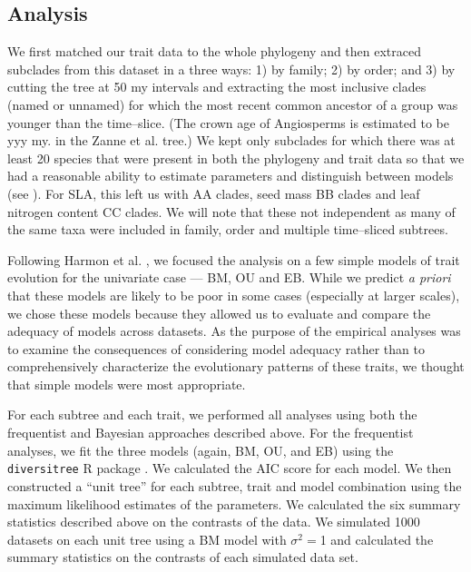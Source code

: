 \documentclass[a4paper,12pt]{article}
\begin{document}
\subsection{Analysis}

We first matched our trait data to the whole phylogeny and then extraced subclades from this dataset in a three ways: 1) by family; 2) by order; and 3) by cutting the tree at 50 my intervals and extracting the most inclusive clades (named or unnamed) for which the most recent common ancestor of a group was younger than the time--slice. (The crown age of Angiosperms is estimated to be yyy my. in the Zanne et al. tree.) We kept only subclades for which there was at least 20 species that were present in both the phylogeny and trait data so that we had a reasonable ability to estimate parameters and distinguish between models (see \citep{Boettiger2012, SlaterPennell}). For SLA, this left us with AA clades, seed mass BB clades and leaf nitrogen content CC clades. We will note that these not independent as many of the same taxa were included in family, order and multiple time--sliced subtrees. 

Following Harmon et al. \citep{Harmon2010}, we focused the analysis on a few simple models of trait evolution for the univariate case --- BM, OU and EB. While we predict \textit{a priori} that these models are likely to be poor in some cases (especially at larger scales), we chose these models because they allowed us to evaluate and compare the adequacy of models across datasets. As the purpose of the empirical analyses was to examine the consequences of considering model adequacy rather than to comprehensively characterize the evolutionary patterns of these traits, we thought that simple models were most appropriate.

For each subtree and each trait, we performed all analyses using both the frequentist and Bayesian approaches described above. For the frequentist analyses, we fit the three models (again, BM, OU, and EB) using the \texttt{diversitree} R package \citep{FitzJohn2012}. We calculated the AIC \citep{Akaike1974} score for each model. We then constructed a ``unit tree'' for each subtree, trait and model combination using the maximum likelihood estimates of the parameters. We calculated the six summary statistics described above on the contrasts of the data. We simulated 1000 datasets on each unit tree using a BM model with $\sigma^2=$1 and calculated the summary statistics on the contrasts of each simulated data set. 
\end{document}
